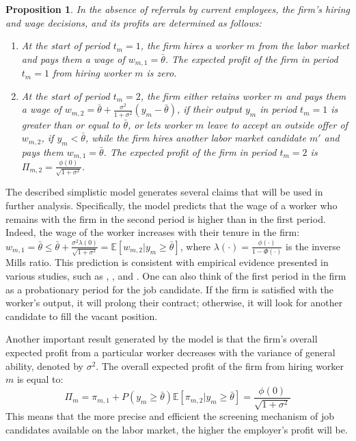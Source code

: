 \documentclass[12pt]{article}
\newtheorem{proposition}{Proposition}
\begin{document}
\begin{proposition}\label{prop:eq_no_ref}
In the absence of referrals by current employees, the firm's hiring and wage decisions, and its profits are determined as follows:
    \begin{enumerate}[label={\roman*})]
        \item At the start of period $t_m = 1$, the firm hires a worker $m$ from the labor market and pays them a wage of $w_{m,1} = \bar{\theta}$. The expected profit of the firm in period $t_m = 1$ from hiring worker $m$ is zero.
        \item At the start of period $t_m = 2$, the firm either retains worker $m$ and pays them a wage of $w_{m,2} = \bar{\theta}+ \frac{\sigma^2}{1+\sigma^2}(y_m-\bar{\theta})$, if their output $y_m$ in period $t_m = 1$ is greater than or equal to $\bar{\theta}$, or lets worker $m$ leave to accept an outside offer of $w_{m,2}$, if $y_m < \bar{\theta}$, while the firm hires another labor market candidate $m'$ and pays them $w_{m,1} = \bar{\theta}$. The expected profit of the firm in period $t_m = 2$ is $\Pi_{m,2} = \frac{\phi(0)}{\sqrt{1+\sigma^2}}$.
	\end{enumerate}
\end{proposition}

The described simplistic model generates several claims that will be used in further analysis. Specifically, the model predicts that the wage of a worker who remains with the firm in the second period is higher than in the first period. Indeed, the wage of the worker increases with their tenure in the firm: $w_{m,1} = \bar{\theta} \leq \bar{\theta}+ \frac{\sigma^2\lambda(0)}{\sqrt{1+\sigma^2}} = \mathbb{E}[w_{m,2}|y_m\geq \bar{\theta}]$, where $\lambda(\cdot) = \frac{\phi(\cdot)}{1-\Phi(\cdot)}$ is the inverse Mills ratio. This prediction is consistent with empirical evidence presented in various studies, such as \cite{medoff1980experience}, \cite{mincer1981labor}, and \cite{topel1991specific}. One can also think of the first period in the firm as a probationary period for the job candidate. If the firm is satisfied with the worker's output, it will prolong their contract; otherwise, it will look for another candidate to fill the vacant position.

Another important result generated by the model is that the firm's overall expected profit from a particular worker decreases with the variance of general ability, denoted by $\sigma^2$. The overall expected profit of the firm from hiring worker $m$ is equal to:
\begin{equation}\label{eq_Pi_m}
    \Pi_m = \pi_{m,1}+P(y_m \geq \bar{\theta})\mathbb{E}\left[\pi_{m,2}|y_m \geq \bar{\theta}\right] = \frac{\phi(0)}{\sqrt{1+\sigma^2}}
\end{equation}
This means that the more precise and efficient the screening mechanism of job candidates available on the labor market, the higher the employer's profit will be.
\end{document}
